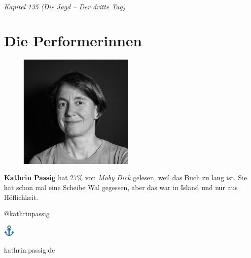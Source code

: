 \documentclass[a5paper,9pt,twoside=false]{extbook}
\begin{document}
\medskip
\noindent\footnotesize{\textit{Kapitel 135 (Die Jagd -- Der dritte Tag)}}

\normalsize


\newpage

\section*{Die Performerinnen}\label{aboutus}

\begin{figure}[h]
{ \centering
\includegraphics[width=0.5\textwidth]{kathrin.jpg} \\
}
\end{figure}

\noindent\textbf{Kathrin Passig} hat 27\% von \textit{Moby Dick} gelesen, weil das Buch zu lang ist. Sie hat schon mal eine Scheibe Wal gegessen, aber das war in Island und nur aus Höflichkeit.

\bigskip

\noindent\begin{minipage}{0.05\textwidth}
\vspace*{-5pt}
\end{minipage}
\begin{minipage}{0.2\textwidth}
{@}kathrinpassig
\end{minipage}
\hspace{5pt}
\noindent\begin{minipage}{0.05\textwidth}
\vspace*{-5pt}
\includegraphics[width=16pt]{anchor.png}
\end{minipage}
\begin{minipage}{0.3\textwidth}
kathrin.passig.de
\end{minipage}
\end{document}
